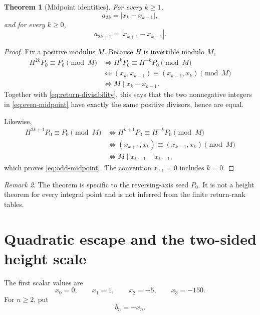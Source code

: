 \documentclass[11pt]{article}
\numberwithin{equation}{section}
\newtheorem{theorem}{Theorem}[section]
\theoremstyle{remark}
\newtheorem{remark}[theorem]{Remark}
\begin{document}
\begin{theorem}[Midpoint identities]
\label{thm:midpoint}
For every \(k\ge1\),
\begin{equation}
 a_{2k}=|x_k-x_{k-1}|,
 \label{eq:even-midpoint}
\end{equation}
and for every \(k\ge0\),
\begin{equation}
 a_{2k+1}=|x_{k+1}-x_{k-1}|.
 \label{eq:odd-midpoint}
\end{equation}
\end{theorem}

\begin{proof}
Fix a positive modulus \(M\).  Because \(H\) is invertible modulo \(M\),
\begin{align*}
 H^{2k}P_0\equiv P_0\pmod M
 &\Longleftrightarrow
 H^kP_0\equiv H^{-k}P_0\pmod M\\
 &\Longleftrightarrow
 (x_k,x_{k-1})\equiv(x_{k-1},x_k)\pmod M\\
 &\Longleftrightarrow
 M\mid x_k-x_{k-1}.
\end{align*}
Together with \eqref{eq:return-divisibility}, this says that the two
nonnegative integers in \eqref{eq:even-midpoint} have exactly the same
positive divisors, hence are equal.

Likewise,
\begin{align*}
 H^{2k+1}P_0\equiv P_0\pmod M
 &\Longleftrightarrow
 H^{k+1}P_0\equiv H^{-k}P_0\pmod M\\
 &\Longleftrightarrow
 (x_{k+1},x_k)\equiv(x_{k-1},x_k)\pmod M\\
 &\Longleftrightarrow
 M\mid x_{k+1}-x_{k-1},
\end{align*}
which proves \eqref{eq:odd-midpoint}.  The convention \(x_{-1}=0\) includes
\(k=0\).
\end{proof}

\begin{remark}
The theorem is specific to the reversing-axis seed \(P_0\).  It is not a
height theorem for every integral point and is not inferred from the
finite return-rank tables.
\end{remark}

\section{Quadratic escape and the two-sided height scale}

The first scalar values are
\begin{equation}
 x_0=0,\qquad x_1=1,\qquad x_2=-5,\qquad x_3=-150.
 \label{eq:first-x-values}
\end{equation}
For \(n\ge2\), put
\begin{equation}
 b_n=-x_n.
 \label{eq:b-definition}
\end{equation}
\end{document}
